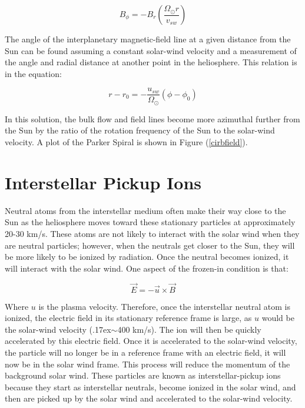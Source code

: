 \documentclass[%
 reprint,
 amsmath,amssymb,
 aps,
]{revtex4-1}
\begin{document}
\begin{equation}
B_{\phi} = -B_r (\frac{\Omega_{\odot} r}{v_{sw}})
\end{equation}





The angle of the interplanetary magnetic-field line at a given distance from the Sun can be found assuming a constant solar-wind velocity and a measurement of the angle and radial distance at another point in the heliosphere. This relation is in the equation:

\begin{equation}
r - r_0 = - \frac{u_{sw}}{\Omega_{\odot} } (\phi - \phi_0)
\end{equation}

In this solution, the bulk flow and field lines become more azimuthal further from the Sun by the ratio of the rotation frequency of the Sun to the solar-wind velocity. A plot of the Parker Spiral is shown in Figure (\ref{cirbfield}). 


\section{Interstellar Pickup Ions}
Neutral atoms from the interstellar medium often make their way close to the Sun as the heliosphere moves toward these stationary particles at approximately 20-30 km/s. These atoms are not likely to interact with the solar wind when they are neutral particles; however, when the neutrals get closer to the Sun, they will be more likely to be ionized by radiation. Once the neutral becomes ionized, it will interact with the solar wind. One aspect of the frozen-in condition is that:

\begin{equation} 
\vec{E} = - \vec{u} \times \vec{B}
\end{equation}

Where $u$ is the plasma velocity. Therefore, once the interstellar neutral atom is ionized, the electric field in its stationary reference frame is large, as $u$ would be the solar-wind velocity (\raise.17ex\hbox{$\scriptstyle\sim$}400 km/s). The ion will then be quickly accelerated by this electric field. Once it is accelerated to the solar-wind velocity, the particle will no longer be in a reference frame with an electric field, it will now be in the solar wind frame. This process will reduce the momentum of the background solar wind. These particles are known as interstellar-pickup ions because they start as interstellar neutrals, become ionized in the solar wind, and then are picked up by the solar wind and accelerated to the solar-wind velocity.
\end{document}
